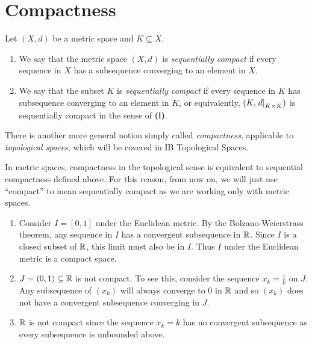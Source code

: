 \documentclass[../main.tex]{subfiles}
\begin{document}
\section{Compactness}
\begin{definition}
  Let $(X, d)$ be a metric space and $K \subseteq X$.
  \begin{enumerate}
    \item We say that the metric space $(X, d)$ is \textit{sequentially compact} if every sequence in $X$ has a subsequence converging to an element in $X$.
    \item We say that the subset $K$ is \textit{sequentially compact} if every sequence in $K$ has subsequence converging to an element in $K$, or equivalently, $(K, \left. d \right|_{K \times K})$ is sequentially compact in the sense of \textbf{(i)}.
  \end{enumerate}
\end{definition}
\begin{remark}
  There is another more general notion simply called \textit{compactness}, applicable to \textit{topological spaces}, which will be covered in IB Topological Spaces.

  In metric spaces, compactness in the topological sense is equivalent to sequential compactness defined above.
  For this reason, from now on, we will just use ``compact'' to mean sequentially compact as we are working only with metric spaces.
\end{remark}
\begin{example}
  \begin{enumerate}
    \item Consider $I = [0, 1]$ under the Euclidean metric.
      By the Bolzano-Weierstrass theorem, any sequence in $I$ has a convergent subsequence in $\mathbb{R}$.
      Since $I$ is a closed subset of $\mathbb{R}$, this limit must also be in $I$.
      Thus $I$ under the Euclidean metric is a compact space.
    \item $J = (0, 1) \subseteq \mathbb{R}$ is not compact.
      To see this, consider the sequence $x_k = \frac{1}{k}$ on $J$.
      Any subsequence of $(x_k)$ will always converge to $0$ in $\mathbb{R}$ and so $(x_k)$ does not have a convergent subsequence converging in $J$.
    \item $\mathbb{R}$ is not compact since the sequence $x_k = k$ has no convergent subsequence as every subsequence is unbounded above.
  \end{enumerate}
\end{example}
\end{document}
